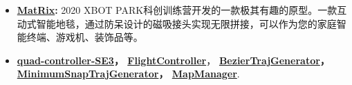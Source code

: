 \documentclass[11pt,a4paper,sans]{moderncv}        %
\begin{document}
\begin{itemize}
\item \textbf{\href{https://www.bilibili.com/video/BV1gb4y127by?share_source=copy_web}{MatRix}:} 2020 XBOT PARK科创训练营开发的一款极其有趣的原型。一款互动式智能地毯，通过防呆设计的磁吸接头实现无限拼接，可以作为您的家庭智能终端、游戏机、装饰品等。



\item \textbf{\href{https://github.com/jianhengLiu/quad_controller_SE3}{quad-controller-SE3}， \href{https://github.com/jianhengLiu/FlightController}{FlightController}}， \textbf{\href{https://github.com/jianhengLiu/BezierTrajGenerator}{BezierTrajGenerator}， \href{https://github.com/jianhengLiu/MinimumSnapTrajGenerator}{MinimumSnapTrajGenerator}，
\href{https://github.com/jianhengLiu/MapManager}{MapManager}}.








\end{itemize}
\end{document}
